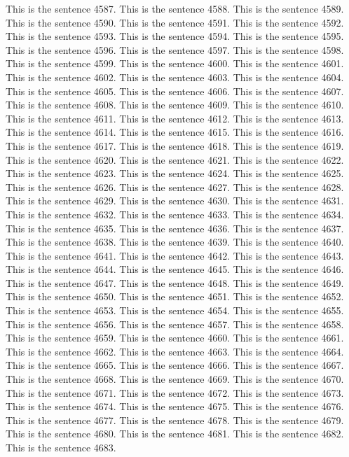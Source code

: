 \documentclass{article}
\begin{document}
This is the sentence 4587.
This is the sentence 4588.
This is the sentence 4589.
This is the sentence 4590.
This is the sentence 4591.
This is the sentence 4592.
This is the sentence 4593.
This is the sentence 4594.
This is the sentence 4595.
This is the sentence 4596.
This is the sentence 4597.
This is the sentence 4598.
This is the sentence 4599.
This is the sentence 4600.
This is the sentence 4601.
This is the sentence 4602.
This is the sentence 4603.
This is the sentence 4604.
This is the sentence 4605.
This is the sentence 4606.
This is the sentence 4607.
This is the sentence 4608.
This is the sentence 4609.
This is the sentence 4610.
This is the sentence 4611.
This is the sentence 4612.
This is the sentence 4613.
This is the sentence 4614.
This is the sentence 4615.
This is the sentence 4616.
This is the sentence 4617.
This is the sentence 4618.
This is the sentence 4619.
This is the sentence 4620.
This is the sentence 4621.
This is the sentence 4622.
This is the sentence 4623.
This is the sentence 4624.
This is the sentence 4625.
This is the sentence 4626.
This is the sentence 4627.
This is the sentence 4628.
This is the sentence 4629.
This is the sentence 4630.
This is the sentence 4631.
This is the sentence 4632.
This is the sentence 4633.
This is the sentence 4634.
This is the sentence 4635.
This is the sentence 4636.
This is the sentence 4637.
This is the sentence 4638.
This is the sentence 4639.
This is the sentence 4640.
This is the sentence 4641.
This is the sentence 4642.
This is the sentence 4643.
This is the sentence 4644.
This is the sentence 4645.
This is the sentence 4646.
This is the sentence 4647.
This is the sentence 4648.
This is the sentence 4649.
This is the sentence 4650.
This is the sentence 4651.
This is the sentence 4652.
This is the sentence 4653.
This is the sentence 4654.
This is the sentence 4655.
This is the sentence 4656.
This is the sentence 4657.
This is the sentence 4658.
This is the sentence 4659.
This is the sentence 4660.
This is the sentence 4661.
This is the sentence 4662.
This is the sentence 4663.
This is the sentence 4664.
This is the sentence 4665.
This is the sentence 4666.
This is the sentence 4667.
This is the sentence 4668.
This is the sentence 4669.
This is the sentence 4670.
This is the sentence 4671.
This is the sentence 4672.
This is the sentence 4673.
This is the sentence 4674.
This is the sentence 4675.
This is the sentence 4676.
This is the sentence 4677.
This is the sentence 4678.
This is the sentence 4679.
This is the sentence 4680.
This is the sentence 4681.
This is the sentence 4682.
This is the sentence 4683.
\end{document}
